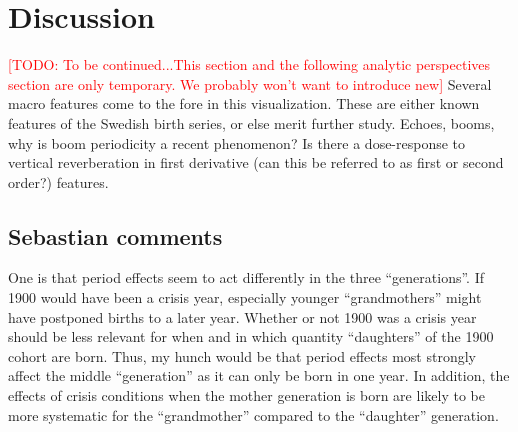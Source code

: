 \documentclass{article}
\newcommand\todo[1]{\textcolor{red}{[TODO: #1]}}
\begin{document}
\section{Discussion}
\todo{To be continued...This section and the following analytic perspectives section are only temporary. We probably won't want to introduce new}
Several macro features come to the fore in this visualization. These are either known features of the Swedish birth series, or else merit further study. Echoes, booms, why is boom periodicity a recent phenomenon? Is there a dose-response to vertical reverberation in first derivative (can this be referred to as first or second order?) features.

\subsection{Sebastian comments}
One is that period effects seem to act differently in the three “generations”. If 1900 would have been a crisis year, especially younger “grandmothers” might have postponed births to a later year. Whether or not 1900 was a crisis year should be less relevant for when and in which quantity “daughters” of the 1900 cohort are born. Thus, my hunch would be that period effects most strongly affect the middle “generation” as it can only be born in one year. In addition, the effects of crisis conditions when the mother generation is born are likely to be more systematic for the “grandmother” compared to the “daughter” generation.


\end{document}
